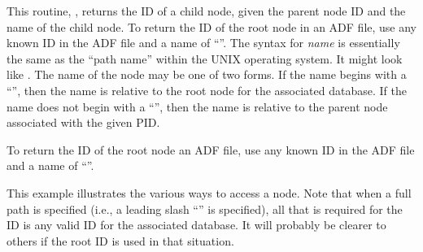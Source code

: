 This routine, , returns the ID of a child node,
given the parent node ID and the name of the child node.
To return the ID of the root node in an ADF file, use any known ID in
the ADF file and a name of ``\fort{/}''.
The syntax for \textit{name} is essentially the same as the ``path
name'' within the UNIX operating system.
It might look like .
The name of the node may be one of two forms.
If the name begins with a ``\fort{/}'', then the name is relative to the
root node for the associated database.
If the name does not begin with a ``\fort{/}'', then the name is
relative to the parent node associated with the given PID.

To return the ID of the root node an ADF file, use any known ID in the
ADF file and a name of ``\fort{/}''.

\hypertarget{ex:Get\_Node\_ID}{}
\Example

This example illustrates the various ways to access a node.
Note that when a full path is specified (i.e., a leading slash
``\fort{/}'' is specified), all that is required for the ID is any valid
ID for the associated database.
It will probably be clearer to others if the root ID is used in that
situation.

